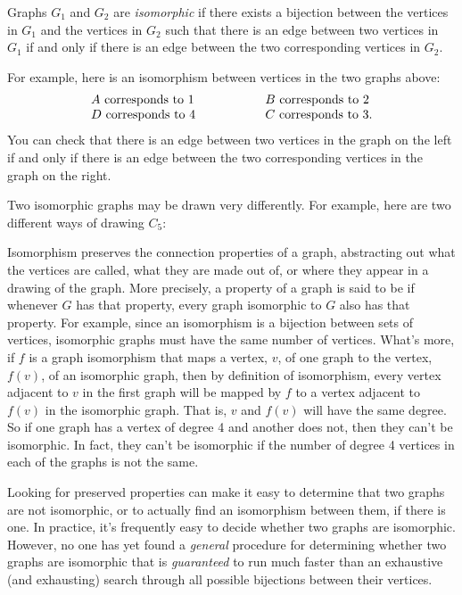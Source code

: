 \begin{staffnotes}
Graphs $G_1$ and $G_2$ are \emph{isomorphic} if there exists a bijection between the
vertices in $G_1$ and the vertices in $G_2$ such that there is an edge between two
vertices in $G_1$ if and only if there is an edge between the two corresponding
vertices in $G_2$.

\end{staffnotes}

For example, here is an isomorphism between vertices in the two graphs above:
\[
\begin{array}{lll}
A \text{ corresponds to } 1 & \hspace{0.5in} & B \text{ corresponds to } 2 \\
D \text{ corresponds to } 4 & & C \text{ corresponds to } 3.
\end{array}
\]
You can check that there is an edge between two vertices in the graph on the left if
and only if there is an edge between the two corresponding vertices in the graph on the
right.

Two isomorphic graphs may be drawn very differently.  For example, here
are two different ways of drawing $C_5$:


Isomorphism preserves the connection properties of a graph, abstracting out what the
vertices are called, what they are made out of, or where they appear in a drawing of
the graph.  More precisely, a property of a graph is said to be  if whenever $G$ has that property, every graph isomorphic to $G$ also has
that property.  For example, since an isomorphism is a bijection between sets of
vertices, isomorphic graphs must have the same number of vertices.  What's more, if $f$
is a graph isomorphism that maps a vertex, $v$, of one graph to the vertex, $f(v)$, of
an isomorphic graph, then by definition of isomorphism, every vertex adjacent to $v$ in
the first graph will be mapped by $f$ to a vertex adjacent to $f(v)$ in the isomorphic
graph.  That is, $v$ and $f(v)$ will have the same degree.  So if one graph has a
vertex of degree 4 and another does not, then they can't be isomorphic.  In fact, they
can't be isomorphic if the number of degree 4 vertices in each of the graphs is not the
same.

Looking for preserved properties can make it easy to determine that
two graphs are not isomorphic, or to actually find an isomorphism
between them, if there is one.  In practice, it's frequently easy to
decide whether two graphs are isomorphic.  However, no one has yet
found a
\emph{general} procedure for determining whether two graphs are isomorphic
that is \emph{guaranteed} to run much faster than an exhaustive (and
exhausting) search through all possible bijections between their
vertices.

